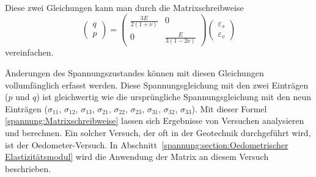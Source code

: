 Diese zwei Gleichungen kann man durch die Matrixschreibweise
\begin{equation}
\begin{pmatrix}
	q\\
	p
\end{pmatrix}
=
\begin{pmatrix}
	\displaystyle{\frac{3E}{2(1+\nu)}} &                                  0 \\
	                                 0 & \displaystyle{\frac{E}{3(1-2\nu)}}
\end{pmatrix}
\begin{pmatrix}
	\varepsilon_{s}\\
	\varepsilon_{v}
\end{pmatrix}
\label{spannung:Matrixschreibweise}
\end{equation}
vereinfachen.

Änderungen des Spannungszustandes können mit diesen Gleichungen vollumfänglich erfasst werden.
Diese Spannungsgleichung mit den zwei Einträgen ($p$ und $q$) ist gleichwertig
wie die ursprüngliche Spannungsgleichung mit den neun Einträgen
($\sigma_{11}$, $\sigma_{12}$, $\sigma_{13}$, $\sigma_{21}$, $\sigma_{22}$, $\sigma_{23}$, $\sigma_{31}$, $\sigma_{32}$, $\sigma_{33}$).
Mit dieser Formel \eqref{spannung:Matrixschreibweise} lassen sich Ergebnisse von Versuchen analysieren und berechnen.
Ein solcher Versuch, der oft in der Geotechnik durchgeführt wird, ist der Oedometer-Versuch.
In Abschnitt~\ref{spannung:section:Oedometrischer Elastizitätsmodul}
wird die Anwendung der Matrix an diesem Versuch beschrieben.
